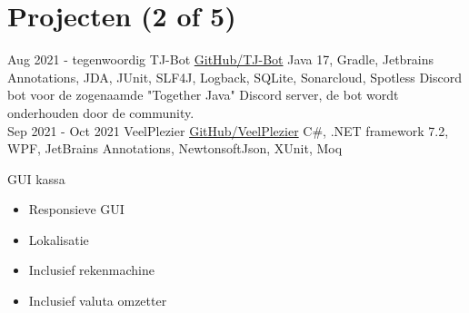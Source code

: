 \documentclass[letterpaper]{twentysecondcv} %
\begin{document}
\vspace{6mm}



\section{Projecten (2 of 5)}
\begin{twenty} %
	\twentyitem
    		{Aug 2021 -}
		{tegenwoordig}
        		{TJ-Bot}
        		{\href{https://github.com/Together-Java/TJ-Bot/}{GitHub/TJ-Bot}}
        		{Java 17, Gradle, Jetbrains Annotations, JDA, JUnit, SLF4J, Logback, SQLite, Sonarcloud, Spotless}
        		{Discord bot voor de zogenaamde "Together Java" Discord server, de bot wordt onderhouden door de community.}\\
	\twentyitem
    		{Sep 2021 -}
		{Oct 2021}
        		{VeelPlezier}
        		{\href{https://github.com/Tais993/VeelPlezier}{GitHub/VeelPlezier}}
        		{C\#, .NET framework 7.2, WPF, JetBrains Annotations, NewtonsoftJson, XUnit, Moq}
        		{
        		GUI kassa
        		\begin{itemize}
        			\item Responsieve GUI
        			\item Lokalisatie
        			\item Inclusief rekenmachine
        			\item Inclusief valuta omzetter
        		\end{itemize}}\\
\end{twenty}

\newpage

\makesidebarSecond %

\end{document}
